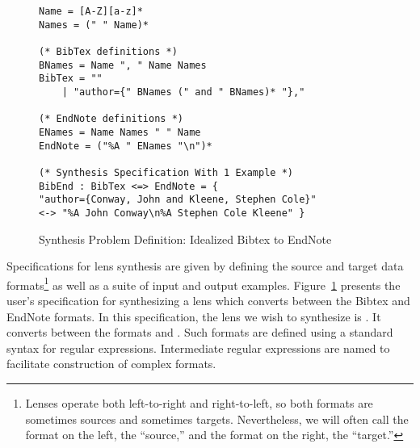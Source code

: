 \documentclass[numbers,10pt,preprint\ifanon ,nocopyrightspace\fi]{sigplanconf}
\begin{document}
\begin{figure}
\begin{lstlisting}
Name = [A-Z][a-z]*
Names = (" " Name)*

(* BibTex definitions *)
BNames = Name ", " Name Names
BibTex = ""
    | "author={" BNames (" and " BNames)* "},"

(* EndNote definitions *)
ENames = Name Names " " Name
EndNote = ("%A " ENames "\n")*

(* Synthesis Specification With 1 Example *)
BibEnd : BibTex <=> EndNote = {
"author={Conway, John and Kleene, Stephen Cole}"
<-> "%A John Conway\n%A Stephen Cole Kleene" }
\end{lstlisting}
  \caption{Synthesis Problem Definition: Idealized Bibtex to EndNote}
  \label{fig:bibend-spec}
\end{figure}

Specifications for lens synthesis are
given by defining the source and target data formats\footnote{Lenses
  operate both left-to-right and right-to-left, so both formats are sometimes
  sources and sometimes targets. Nevertheless, we will often call the
  format on the left, the ``source,'' and the format on the right, 
  the ``target.''} as well as a suite of input and output examples.
Figure~\ref{fig:bibend-spec} presents
the user's specification for synthesizing a lens which converts between the
Bibtex and EndNote formats.
In this specification, the lens
we wish to synthesize is .  It converts between 
the formats  and .
Such formats are defined using a standard syntax for regular expressions.
Intermediate regular expressions are named to facilitate
construction of complex formats.
\end{document}
